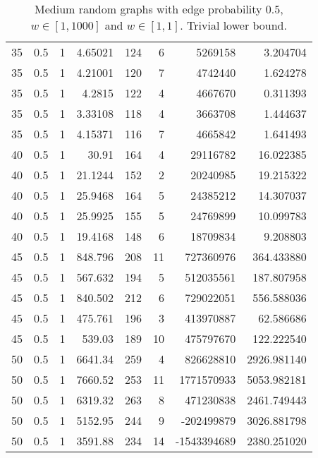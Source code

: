 \documentclass[a4paper,11pt]{article}
\begin{document}
\begin{table}
\begin{center}
\begin{tabular}{|rrr|r|r|rr|r|}
\hline
35 & 0.5 & 1 & 4.65021 & 124 & 6 & 5269158 & 3.204704 \\
35 & 0.5 & 1 & 4.21001 & 120 & 7 & 4742440 & 1.624278 \\
35 & 0.5 & 1 & 4.2815 & 122 & 4 & 4667670 & 0.311393 \\
35 & 0.5 & 1 & 3.33108 & 118 & 4 & 3663708 & 1.444637 \\
35 & 0.5 & 1 & 4.15371 & 116 & 7 & 4665842 & 1.641493 \\
40 & 0.5 & 1 & 30.91 & 164 & 4 & 29116782 & 16.022385 \\
40 & 0.5 & 1 & 21.1244 & 152 & 2 & 20240985 & 19.215322 \\
40 & 0.5 & 1 & 25.9468 & 164 & 5 & 24385212 & 14.307037 \\
40 & 0.5 & 1 & 25.9925 & 155 & 5 & 24769899 & 10.099783 \\
40 & 0.5 & 1 & 19.4168 & 148 & 6 & 18709834 & 9.208803 \\
45 & 0.5 & 1 & 848.796 & 208 & 11 & 727360976 & 364.433880 \\
45 & 0.5 & 1 & 567.632 & 194 & 5 & 512035561 & 187.807958 \\
45 & 0.5 & 1 & 840.502 & 212 & 6 & 729022051 & 556.588036 \\
45 & 0.5 & 1 & 475.761 & 196 & 3 & 413970887 & 62.586686 \\
45 & 0.5 & 1 & 539.03 & 189 & 10 & 475797670 & 122.222540 \\
50 & 0.5 & 1 & 6641.34 & 259 & 4 & 826628810 & 2926.981140 \\
50 & 0.5 & 1 & 7660.52 & 253 & 11 & 1771570933 & 5053.982181 \\
50 & 0.5 & 1 & 6319.32 & 263 & 8 & 471230838 & 2461.749443 \\
50 & 0.5 & 1 & 5152.95 & 244 & 9 & -202499879 & 3026.881798 \\
50 & 0.5 & 1 & 3591.88 & 234 & 14 & -1543394689 & 2380.251020 \\
\hline
\end{tabular}
\end{center}
\caption{Medium random graphs with edge probability $0.5$,
  $w\in[1,1000]$ and $w\in[1,1]$. Trivial lower bound.}
\label{tab:medium-norebal}
\end{table}
\end{document}
